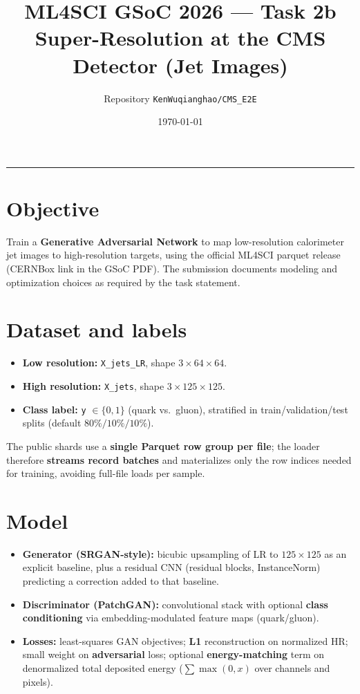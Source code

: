 \documentclass[11pt,a4paper]{article}
\title{ML4SCI GSoC 2026 --- Task 2b\\\large Super-Resolution at the CMS Detector (Jet Images)}
\author{Repository \texttt{KenWuqianghao/CMS\_E2E}}
\date{\today}
\begin{document}
\maketitle
\tableofcontents
\vspace{1em}
\hrule
\vspace{1em}

\section{Objective}
Train a \textbf{Generative Adversarial Network} to map low-resolution calorimeter jet images to high-resolution targets, using the official ML4SCI parquet release (CERNBox link in the GSoC PDF). The submission documents modeling and optimization choices as required by the task statement.

\section{Dataset and labels}
\begin{itemize}
  \item \textbf{Low resolution:} \texttt{X\_jets\_LR}, shape $3 \times 64 \times 64$.
  \item \textbf{High resolution:} \texttt{X\_jets}, shape $3 \times 125 \times 125$.
  \item \textbf{Class label:} \texttt{y} $\in \{0,1\}$ (quark vs.\ gluon), stratified in train/validation/test splits (default $80\%/10\%/10\%$).
\end{itemize}
The public shards use a \textbf{single Parquet row group per file}; the loader therefore \textbf{streams record batches} and materializes only the row indices needed for training, avoiding full-file loads per sample.

\section{Model}
\begin{itemize}
  \item \textbf{Generator (SRGAN-style):} bicubic upsampling of LR to $125\times 125$ as an explicit baseline, plus a residual CNN (residual blocks, InstanceNorm) predicting a correction added to that baseline.
  \item \textbf{Discriminator (PatchGAN):} convolutional stack with optional \textbf{class conditioning} via embedding-modulated feature maps (quark/gluon).
  \item \textbf{Losses:} least-squares GAN objectives; \textbf{L1} reconstruction on normalized HR; small weight on \textbf{adversarial} loss; optional \textbf{energy-matching} term on denormalized total deposited energy ($\sum \max(0,x)$ over channels and pixels).
\end{itemize}
\end{document}
